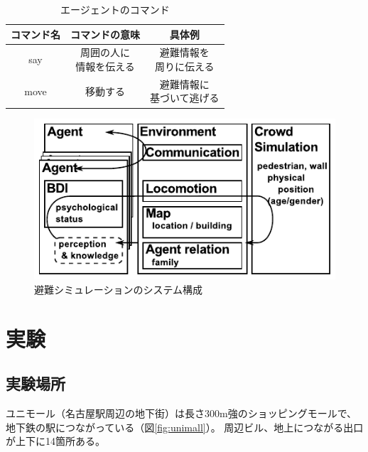 \documentclass[a4j]{jarticle}
\begin{document}
\begin{table}[h]
\centering
\caption{エージェントのコマンド}
\begin{tabular}[tb]{|c|c|c|}\hline
コマンド名 & コマンドの意味 & 具体例 \\ \hline \hline
\shortstack{say\\\vspace{3mm}} & \shortstack{周囲の人に\\ 情報を伝える} & \shortstack{避難情報を\\周りに伝える} \\
\hline
\shortstack{move\\\vspace{3mm}} & \shortstack{移動する\\\vspace{3mm}} &\shortstack{避難情報に\\基づいて逃げる} \\ \hline
\end{tabular}
\end{table}

\begin{figure}[h]
\centering
\includegraphics{./fig/system-architecture.pdf}
\caption{避難シミュレーションのシステム構成}
\label{fig:system-architecture}
\end{figure}


\section{実験}


\subsection{実験場所}
ユニモール（名古屋駅周辺の地下街）は長さ300m強のショッピングモールで、地下鉄の駅につながっている（図\ref{fig:unimall}）。
周辺ビル、地上につながる出口が上下に14箇所ある。
\end{document}
